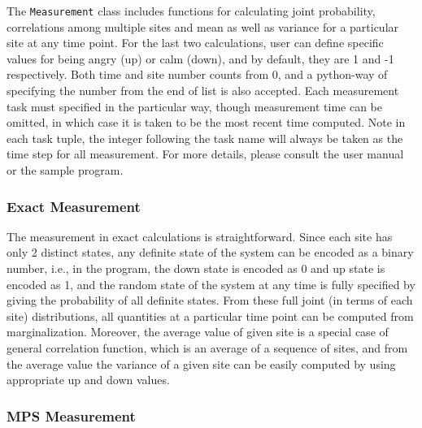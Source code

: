 
The \texttt{Measurement} class includes functions for calculating joint probability, correlations among multiple sites and mean as well as variance for a particular site at any time point. For the last two calculations, user can define specific values for being angry (up) or calm (down), and by default, they are 1 and -1 respectively. Both time and site number counts from 0, and a python-way of specifying the number from the end of list is also accepted. Each measurement task must specified in the particular way, though measurement time can be omitted, in which case it is taken to be the most recent time computed. Note in each task tuple, the integer following the task name will always be taken as the time step for all measurement. For more details, please consult the user manual or the sample program.



\subsubsection{Exact Measurement}

The measurement in exact calculations is straightforward. Since each site has only 2 distinct states, any definite state of the system can be encoded as a binary number, i.e., in  the program, the down state is encoded as 0 and up state is encoded as 1, and the random state of the system at any time is fully specified by giving the probability of all definite states. From these full joint (in terms of each site) distributions, all quantities at a particular time point can be computed from marginalization. Moreover, the average value of given site is a special case of general correlation function, which is an average of a sequence of sites, and from the average value the variance of a given site can be easily computed by using appropriate up and down values.



\subsubsection{MPS Measurement}

